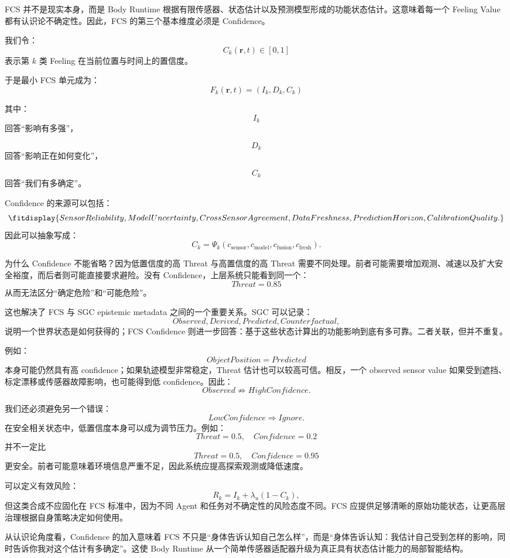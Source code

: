 FCS 并不是现实本身，而是 Body Runtime 根据有限传感器、状态估计以及预测模型形成的功能状态估计。这意味着每一个 Feeling Value 都有认识论不确定性。因此，FCS 的第三个基本维度必须是 Confidence。

我们令：
\[
C_k(\mathbf r,t)\in[0,1]
\]
表示第 $k$ 类 Feeling 在当前位置与时间上的置信度。

于是最小 FCS 单元成为：
\[
\boxed{
F_k(\mathbf r,t)
=
\left(
I_k,
D_k,
C_k
\right)
}
\]

其中：
\[
I_k
\]
回答“影响有多强”，

\[
D_k
\]
回答“影响正在如何变化”，

\[
C_k
\]
回答“我们有多确定”。

Confidence 的来源可以包括：
\[
\fitdisplay{
SensorReliability,
ModelUncertainty,
CrossSensorAgreement,
DataFreshness,
PredictionHorizon,
CalibrationQuality.
}
\]
因此可以抽象写成：
\[
C_k
=
\Psi_k
(
c_{\mathrm{sensor}},
c_{\mathrm{model}},
c_{\mathrm{fusion}},
c_{\mathrm{fresh}}
).
\]

为什么 Confidence 不能省略？因为低置信度的高 Threat 与高置信度的高 Threat 需要不同处理。前者可能需要增加观测、减速以及扩大安全裕度，而后者则可能直接要求避险。没有 Confidence，上层系统只能看到同一个：
\[
Threat=0.85
\]
从而无法区分“确定危险”和“可能危险”。

这也解决了 FCS 与 SGC epistemic metadata 之间的一个重要关系。SGC 可以记录：
\[
Observed,
Derived,
Predicted,
Counterfactual,
\]
说明一个世界状态是如何获得的；FCS Confidence 则进一步回答：基于这些状态计算出的功能影响到底有多可靠。二者关联，但并不重复。

例如：
\[
ObjectPosition
=
Predicted
\]
本身可能仍然具有高 confidence；如果轨迹模型非常稳定，Threat 估计也可以较高可信。相反，一个 observed sensor value 如果受到遮挡、标定漂移或传感器故障影响，也可能得到低 confidence。因此：
\[
Observed
\not\Rightarrow
HighConfidence.
\]

我们还必须避免另一个错误：
\[
LowConfidence
\Rightarrow
Ignore.
\]
在安全相关状态中，低置信度本身可以成为调节压力。例如：
\[
Threat=0.5,\quad Confidence=0.2
\]
并不一定比
\[
Threat=0.5,\quad Confidence=0.95
\]
更安全。前者可能意味着环境信息严重不足，因此系统应提高探索观测或降低速度。

可以定义有效风险：
\[
R_k
=
I_k
+
\lambda_u(1-C_k),
\]
但这类合成不应固化在 FCS 标准中，因为不同 Agent 和任务对不确定性的风险态度不同。FCS 应提供足够清晰的原始功能状态，让更高层治理根据自身策略决定如何使用。

从认识论角度看，Confidence 的加入意味着 FCS 不只是“身体告诉认知自己怎么样”，而是“身体告诉认知：我估计自己受到怎样的影响，同时告诉你我对这个估计有多确定”。这使 Body Runtime 从一个简单传感器适配器升级为真正具有状态估计能力的局部智能结构。

